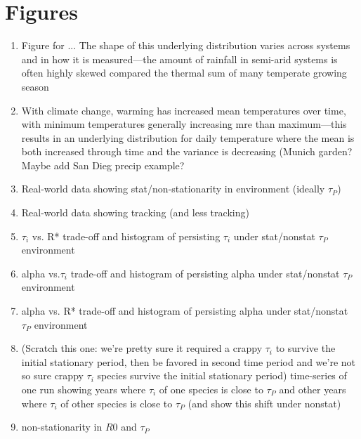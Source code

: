 \documentclass[11pt,letterpaper]{article}
\begin{document}
\section{Figures}
\begin{enumerate}
\item Figure for ... The shape of this underlying distribution varies across systems and in how it is measured---the amount of rainfall in semi-arid systems is often highly skewed compared the thermal sum of many temperate growing season
\item With climate change, warming has increased mean temperatures over time, with minimum temperatures generally increasing mre than maximum---this results in an underlying distribution for daily temperature where the mean is both increased through time and the variance is decreasing (Munich garden? Maybe add San Dieg precip example?
\item Real-world data showing stat/non-stationarity in environment (ideally $\tau_{P}$) 
\item Real-world data showing tracking (and less tracking)
\item $\tau_{i}$ vs. R* trade-off and histogram of persisting $\tau_i$ under stat/nonstat $\tau_{P}$ environment
\item alpha vs.$\tau_i$ trade-off and histogram of persisting alpha under stat/nonstat $\tau_{P}$ environment
\item alpha vs. R* trade-off and histogram of persisting alpha under stat/nonstat $\tau_{P}$ environment
\item (Scratch this one: we're pretty sure it required a crappy $\tau_i$ to survive the initial stationary period, then be favored in second time period and we're not so sure crappy $\tau_i$ species survive the initial stationary period) time-series of one run showing years where $\tau_i$ of one species is close to $\tau_{P}$ and other years where $\tau_i$ of other species is close to $\tau_{P}$ (and show this shift under nonstat)
\item non-stationarity in $R0$ and $\tau_{P}$
\end{enumerate}




\end{document}
